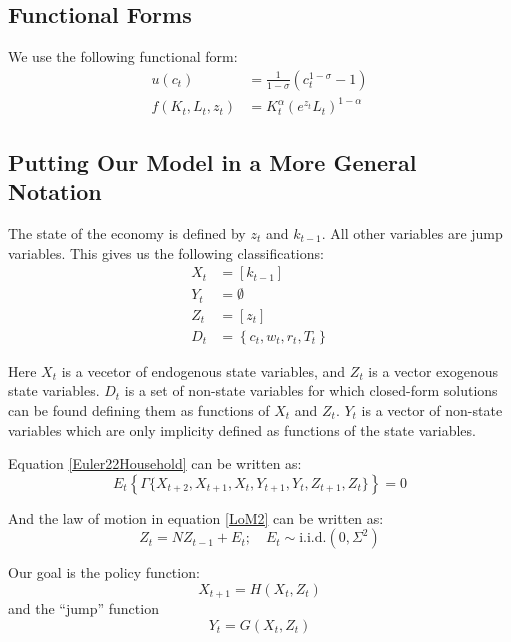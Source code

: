 \documentclass[letterpaper,12pt]{article}
\theoremstyle{definition}
\begin{document}
\begin{spacing}{1.5}
	\subsection{Functional Forms}
		We use the following functional form:
		\begin{align}
			u(c_t) & = \tfrac{1}{1-\sigma}(c_t^{1-\sigma} -1 ) \\
			f(K_t,L_t,z_t) & = K_t^\alpha \left( e^{z_t} L_t \right)^{1-\alpha}
		\end{align}

	\subsection{Putting Our Model in a More General Notation}

		The state of the economy is defined by $z_t$ and $k_{t-1}$. All other variables are jump variables. This gives us the following classifications:
		\begin{equation}\label{XYZ}
		\begin{split}
		X_t & = \left[k_{t-1}\right] \\
		Y_t & = \emptyset \\
		Z_t & = \left[z_t\right] \\
		D_t & = \left\{c_t,w_t,r_t,T_t\right\}
		\end{split}
		\end{equation}

		Here $X_t$ is a vecetor of endogenous state variables, and $Z_t$ is a vector exogenous state variables.  $D_t$ is a set of non-state variables for which closed-form solutions can be found defining them as functions of $X_t$ and $Z_t$. $Y_t$ is a vector of non-state variables which are only implicity defined as functions of the state variables.

		Equation \eqref{Euler22Household} can be written as:
		\begin{equation}\label{GammaEqn}
			E_t\left\{\Gamma\{X_{t+2},X_{t+1},X_{t},Y_{t+1},Y_{t},Z_{t+1},Z_{t}\} \right\}= 0
		\end{equation}

		And the law of motion in equation \eqref{LoM2}	can be written as:
		\begin{equation}\label{Zlom}
			Z_{t} = N Z_{t-1}+ E_t ;\quad E_t\sim\text{i.i.d.}(0,\Sigma^2)
		\end{equation}

		Our goal is the policy function:
		\begin{equation}\label{HEqn}
			X_{t+1} = H (X_t,Z_t)
		\end{equation}
		and the ``jump'' function
		\begin{equation}\label{GEqn}
			Y_{t} = G (X_t,Z_t)
		\end{equation}


\end{spacing}
\end{document}
